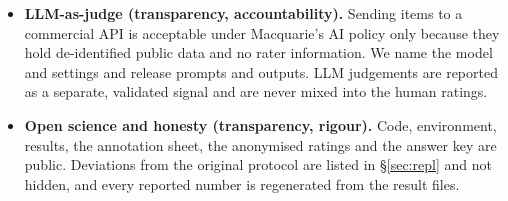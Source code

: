 \begin{itemize}
\item \textbf{LLM-as-judge (transparency, accountability).} Sending items to a commercial API is acceptable under Macquarie's AI policy \citep{mqaipolicy} only because they hold de-identified public data and no rater information. We name the model and settings and release prompts and outputs. LLM judgements are reported as a separate, validated signal and are never mixed into the human ratings.
\item \textbf{Open science and honesty (transparency, rigour).} Code, environment, results, the annotation sheet, the anonymised ratings and the answer key are public. Deviations from the original protocol are listed in \S\ref{sec:repl} and not hidden, and every reported number is regenerated from the result files.
\end{itemize}
